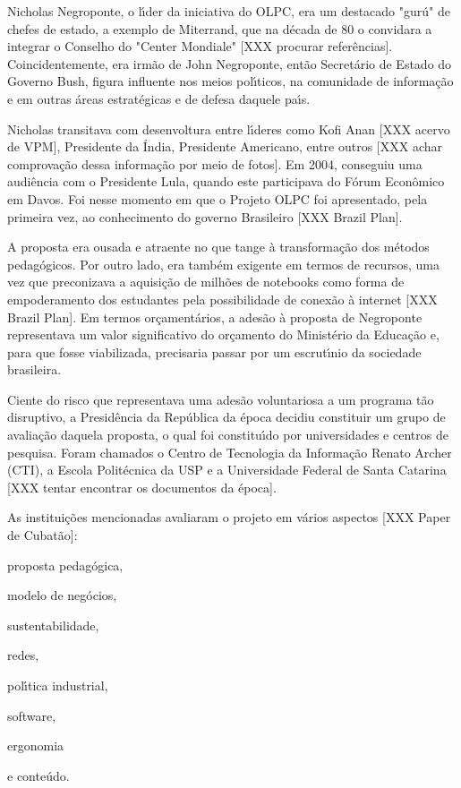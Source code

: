 \documentclass[
12pt,		%
openright,	%
twoside,  %
a4paper,			%
chapter=TITLE,		%
english,			%
french,				%
spanish,			%
brazil				%
]{USPSC-classe/USPSC}
\begin{document}
Nicholas Negroponte, o l\'{\i}der da iniciativa do OLPC, era um destacado "gur\'u" de chefes de estado, a exemplo de Miterrand, que na d\'ecada de 80 o convidara a integrar o Conselho do "Center Mondiale" [XXX procurar refer\^encias]. Coincidentemente, era irm\~ao de John Negroponte, ent\~ao Secret\'ario de Estado do Governo Bush, figura influente nos meios pol\'{\i}ticos, na comunidade de informa\c{c}\~ao e em outras \'areas estrat\'egicas e de defesa daquele pa\'{\i}s.


Nicholas transitava com desenvoltura entre l\'{\i}deres como Kofi Anan [XXX acervo de VPM], Presidente da \'India, Presidente Americano, entre outros [XXX achar comprova\c{c}\~ao dessa informa\c{c}\~ao por meio de fotos]. Em 2004, conseguiu uma audi\^encia com o Presidente Lula, quando este participava do F\'orum  Econ\^omico  em Davos. Foi nesse momento em que o Projeto OLPC foi apresentado, pela primeira vez, ao conhecimento do governo Brasileiro [XXX Brazil Plan].


A proposta era ousada e atraente no que tange \`a transforma\c{c}\~ao dos m\'etodos pedag\'ogicos. Por outro lado, era tamb\'em exigente em termos de recursos, uma vez que preconizava a aquisi\c{c}\~ao de milh\~oes de notebooks como forma de empoderamento dos estudantes pela possibilidade de conex\~ao \`a internet [XXX Brazil Plan]. Em termos or\c{c}ament\'arios, a ades\~ao \`a proposta de Negroponte representava um valor significativo do or\c{c}amento do Minist\'erio da Educa\c{c}\~ao e, para que fosse viabilizada, precisaria passar por um escrut\'{\i}nio da sociedade brasileira.


Ciente do risco que representava uma ades\~ao voluntariosa a um programa t\~ao disruptivo, a Presid\^encia da Rep\'ublica da \'epoca decidiu constituir um grupo de avalia\c{c}\~ao  daquela proposta, o  qual foi constitu\'{\i}do por universidades e centros de pesquisa. Foram chamados o Centro de Tecnologia da Informa\c{c}\~ao Renato Archer (CTI), a Escola Polit\'ecnica da USP e a Universidade Federal de Santa Catarina [XXX tentar encontrar os documentos da \'epoca]. 


As institui\c{c}\~oes mencionadas avaliaram o projeto em v\'arios aspectos [XXX Paper de Cubat\~ao]:



\begin{alineas}
\item proposta pedag\'ogica,
\item modelo de neg\'ocios,
\item sustentabilidade,
\item redes,
\item pol\'{\i}tica industrial,
\item software,
\item ergonomia
\item e conte\'udo.
\end{alineas}
\end{document}
